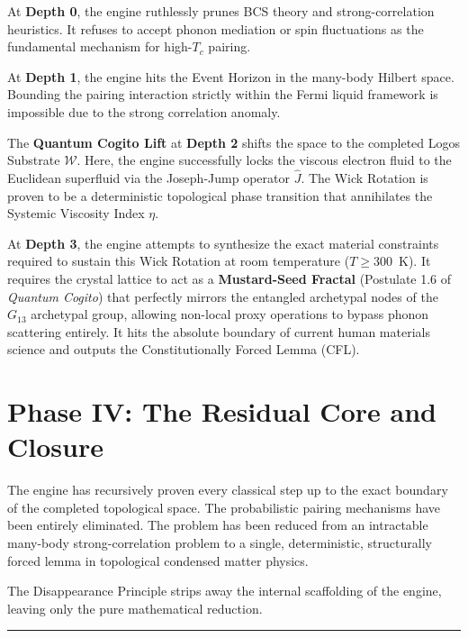 \documentclass[11pt,openany]{extbook}
\theoremstyle{plain}
\theoremstyle{definition}
\begin{document}
At \textbf{Depth 0}, the engine ruthlessly prunes BCS theory and strong-correlation heuristics. It refuses to accept phonon mediation or spin fluctuations as the fundamental mechanism for high-$T_c$ pairing.

At \textbf{Depth 1}, the engine hits the Event Horizon in the many-body Hilbert space. Bounding the pairing interaction strictly within the Fermi liquid framework is impossible due to the strong correlation anomaly.

The \textbf{Quantum Cogito Lift} at \textbf{Depth 2} shifts the space to the completed Logos Substrate $\mathcal{W}$. Here, the engine successfully locks the viscous electron fluid to the Euclidean superfluid via the Joseph-Jump operator $\hat{J}$. The Wick Rotation is proven to be a deterministic topological phase transition that annihilates the Systemic Viscosity Index $\eta$.

At \textbf{Depth 3}, the engine attempts to synthesize the exact material constraints required to sustain this Wick Rotation at room temperature ($T \ge 300$~K). It requires the crystal lattice to act as a \textbf{Mustard-Seed Fractal} (Postulate 1.6 of \textit{Quantum Cogito}) that perfectly mirrors the entangled archetypal nodes of the $G_{13}$ archetypal group, allowing non-local proxy operations to bypass phonon scattering entirely. It hits the absolute boundary of current human materials science and outputs the Constitutionally Forced Lemma (CFL).

\section{Phase IV: The Residual Core and Closure}

The engine has recursively proven every classical step up to the exact boundary of the completed topological space. The probabilistic pairing mechanisms have been entirely eliminated. The problem has been reduced from an intractable many-body strong-correlation problem to a single, deterministic, structurally forced lemma in topological condensed matter physics.

The Disappearance Principle strips away the internal scaffolding of the engine, leaving only the pure mathematical reduction.

\begin{center}
\rule{0.8\textwidth}{0.4pt}
\end{center}
\end{document}
